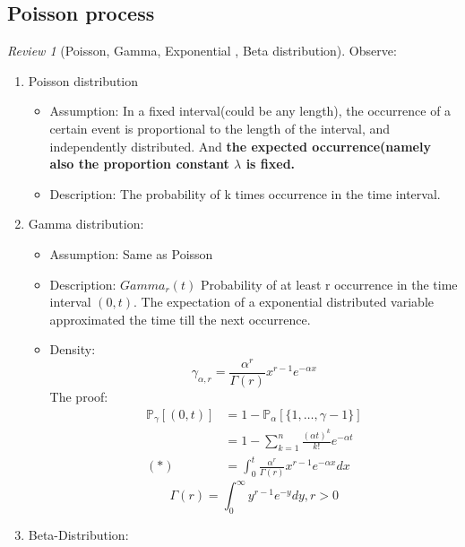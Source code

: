 \documentclass[a4paper,11pt]{book}
\theoremstyle{definition}
\theoremstyle{remark}
\newtheorem{review}{Review}
\begin{document}
\subsection{Poisson process}
\begin{review}[Poisson, Gamma, Exponential
, Beta distribution]Observe: 
\begin{enumerate}
    \item Poisson distribution \begin{itemize}
        \item Assumption: In a fixed interval(could be any length), the occurrence of a certain event is proportional to the length of the interval, and independently distributed. And \textbf{the expected occurrence(namely also the proportion constant $\lambda$ is fixed.}
        \item Description: The probability of k times occurrence in the time interval. 
        \end{itemize}
    \item Gamma distribution:\begin{itemize}
        \item Assumption: Same as Poisson
        \item Description: $Gamma_r(t)$ Probability of at least r occurrence in  the time interval $(0, t)$. The expectation of a exponential distributed variable approximated the time till the next occurrence.
        \item Density:\begin{equation}
            \gamma_{\alpha, r} = \frac{\alpha^r}{\Gamma(r)} x^{r -1 } e^{- \alpha x}
        \end{equation}
        The proof:
        \begin{equation*}
        \begin{aligned}
            \mathbb{P}_{\gamma}[(0, t)] &= 1 - \mathbb{P}_{\alpha}[\{ 1, \dots,  \gamma - 1\}] \\
            &= 1 - \sum_{k = 1}^{n} \frac{(\alpha t)^k}{k!} e^{-\alpha t}\\
            (*)&= \int_0^t\frac{\alpha^r}{\Gamma(r)} x^{r -1 } e^{- \alpha x} dx
            \end{aligned}
        \end{equation*}
        \begin{equation}
            \Gamma(r) = \int_{0}^{\infty} y^{r - 1} e^{-y} dy, r > 0
        \end{equation}
        \end{itemize}
    \item Beta-Distribution:
\end{enumerate}
\end{review}
\end{document}
